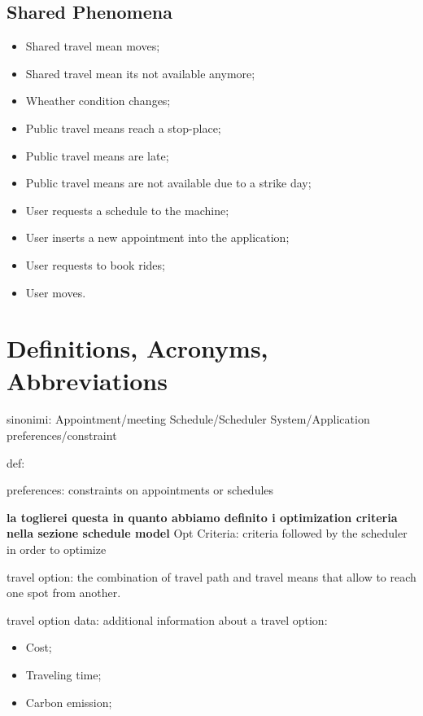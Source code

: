 \subsection{Shared Phenomena}
\begin{itemize}
\item Shared travel mean moves;
\item Shared travel mean its not available anymore;
\item Wheather condition changes;
\item Public travel means reach a stop-place;
\item Public travel means are late; 
\item Public travel means are not available due to a strike day;
\item User requests a schedule to the machine;
\item User inserts a new appointment into the application;
\item User requests to book rides;
\item User moves.
\end{itemize}

\section{Definitions, Acronyms, Abbreviations}

\newtheorem{mydef}{Definition}

sinonimi:
Appointment/meeting
Schedule/Scheduler
System/Application
preferences/constraint

%

def:

preferences: constraints on appointments or schedules

\textbf{la toglierei questa in quanto abbiamo definito i optimization criteria nella sezione schedule model}
Opt Criteria: criteria followed by the scheduler in order to optimize

travel option: the combination of travel path and travel means that allow to reach one spot from another.

travel option data: additional information about a travel option:
\begin{itemize}
\item Cost;
\item Traveling time;
\item Carbon emission;
\end{itemize}

